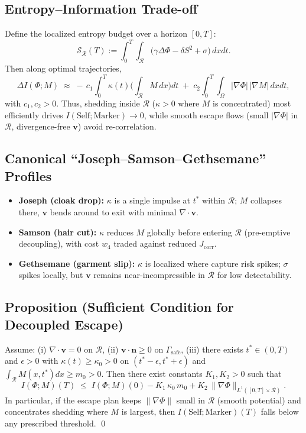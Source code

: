 \documentclass[a4paper,11pt,openany]{book}
\begin{document}
\subsection{Entropy–Information Trade-off}
Define the localized entropy budget over a horizon $[0,T]$:
\[
\mathcal{S}_{\mathcal{R}}(T) := \int_0^T\!\!\int_{\mathcal{R}} \big(\gamma \Delta \Phi - \delta S^2 + \sigma\big)\,dxdt.
\]
Then along optimal trajectories,
\[
\Delta I(\Phi;M)\;\approx\;-\,c_1 \!\int_0^T \kappa(t)\bigg(\int_{\mathcal{R}} M\,dx\bigg) dt \;+\; c_2 \!\int_0^T\!\!\int_{\Omega}\! |\nabla \Phi|\,|\nabla M|\,dxdt,
\]
with $c_1,c_2>0$. Thus, shedding inside $\mathcal{R}$ ($\kappa>0$ where $M$ is concentrated) most efficiently drives $I(\text{Self};\text{Marker})\to 0$, while smooth escape flows (small $|\nabla \Phi|$ in $\mathcal{R}$, divergence-free $\mathbf{v}$) avoid re-correlation.

\subsection{Canonical “Joseph–Samson–Gethsemane” Profiles}
\begin{itemize}
  \item \textbf{Joseph (cloak drop):} $\kappa$ is a single impulse at $t^\ast$ within $\mathcal{R}$; $M$ collapses there, $\mathbf{v}$ bends around to exit with minimal $\nabla\!\cdot \mathbf{v}$.
  \item \textbf{Samson (hair cut):} $\kappa$ reduces $M$ globally before entering $\mathcal{R}$ (pre-emptive decoupling), with cost $w_4$ traded against reduced $J_{\text{corr}}$.
  \item \textbf{Gethsemane (garment slip):} $\kappa$ is localized where capture risk spikes; $\sigma$ spikes locally, but $\mathbf{v}$ remains near-incompressible in $\mathcal{R}$ for low detectability.
\end{itemize}

\subsection{Proposition (Sufficient Condition for Decoupled Escape)}
Assume: (i) $\nabla\!\cdot \mathbf{v}=0$ on $\mathcal{R}$, (ii) $\mathbf{v}\cdot \mathbf{n}\ge 0$ on $\Gamma_{\text{safe}}$, (iii) there exists $t^\ast\in(0,T)$ and $\epsilon>0$ with $\kappa(t)\ge \kappa_0>0$ on $(t^\ast-\epsilon,t^\ast+\epsilon)$ and $\int_{\mathcal{R}} M(x,t^\ast)dx \ge m_0>0$.
Then there exist constants $K_1,K_2>0$ such that
\[
I(\Phi;M)(T) \;\le\; I(\Phi;M)(0) - K_1\,\kappa_0\,m_0 + K_2\,\| \nabla \Phi\|_{L^1([0,T]\times \mathcal{R})}.
\]
In particular, if the escape plan keeps $\|\nabla\Phi\|$ small in $\mathcal{R}$ (smooth potential) and concentrates shedding where $M$ is largest, then $I(\text{Self};\text{Marker})(T)$ falls below any prescribed threshold.
\qed
\end{document}
